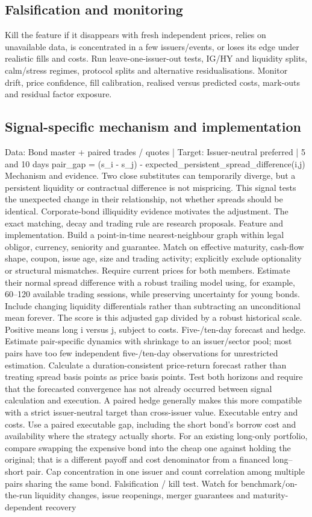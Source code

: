 \documentclass[10pt]{article}
\begin{document}
\subsection{Falsification and monitoring}
Kill the feature if it disappears with fresh independent prices, relies on unavailable data, is concentrated in a few issuers/events, or loses its edge under realistic fills and costs. Run leave-one-issuer-out tests, IG/HY and liquidity splits, calm/stress regimes, protocol splits and alternative residualisations. Monitor drift, price confidence, fill calibration, realised versus predicted costs, mark-outs and residual factor exposure.
\subsection{Signal-specific mechanism and implementation}
Data: Bond master + paired trades / quotes  |  Target: Issuer-neutral preferred  |  5 and 10 days pair\_gap = (s\_i - s\_j) - expected\_persistent\_spread\_difference(i,j) Mechanism and evidence.  Two close substitutes can temporarily diverge, but a persistent liquidity or contractual difference is not mispricing. This signal tests the unexpected change in their relationship, not whether spreads should be identical. Corporate-bond illiquidity evidence motivates the adjustment. The exact matching, decay and trading rule are research proposals. Feature and implementation.  Build a point-in-time nearest-neighbour graph within legal obligor, currency, seniority and guarantee. Match on effective maturity, cash-flow shape, coupon, issue age, size and trading activity; explicitly exclude optionality or structural mismatches. Require current prices for both members. Estimate their normal spread difference with a robust trailing model using, for example, 60--120 available trading sessions, while preserving uncertainty for young bonds. Include changing liquidity differentials rather than subtracting an unconditional mean forever. The score is this adjusted gap divided by a robust historical scale. Positive means long i versus j, subject to costs. Five-/ten-day forecast and hedge.  Estimate pair-specific dynamics with shrinkage to an issuer/sector pool; most pairs have too few independent five-/ten-day observations for unrestricted estimation. Calculate a duration-consistent price-return forecast rather than treating spread basis points as price basis points. Test both horizons and require that the forecasted convergence has not already occurred between signal calculation and execution. A paired hedge generally makes this more compatible with a strict issuer-neutral target than cross-issuer value. Executable entry and costs.  Use a paired executable gap, including the short bond’s borrow cost and availability where the strategy actually shorts. For an existing long-only portfolio, compare swapping the expensive bond into the cheap one against holding the original; that is a different payoff and cost denominator from a financed long--short pair. Cap concentration in one issuer and count correlation among multiple pairs sharing the same bond. Falsification / kill test.  Watch for benchmark/on-the-run liquidity changes, issue reopenings, merger guarantees and maturity-dependent recovery 
\end{document}
